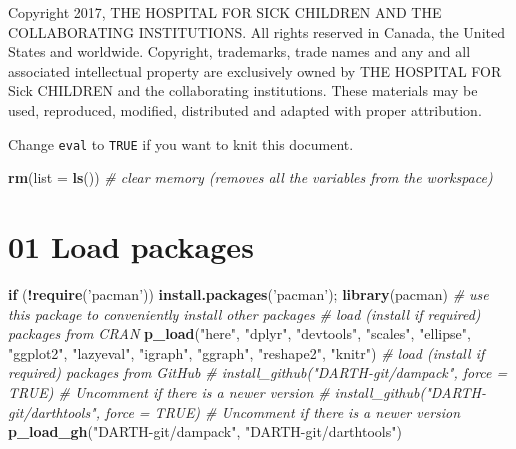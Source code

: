 \documentclass[
]{article}
\newenvironment{Shaded}{\begin{snugshade}}{\end{snugshade}}
\newcommand{\CommentTok}[1]{\textcolor[rgb]{0.56,0.35,0.01}{\textit{#1}}}
\newcommand{\ControlFlowTok}[1]{\textcolor[rgb]{0.13,0.29,0.53}{\textbf{#1}}}
\newcommand{\DataTypeTok}[1]{\textcolor[rgb]{0.13,0.29,0.53}{#1}}
\newcommand{\KeywordTok}[1]{\textcolor[rgb]{0.13,0.29,0.53}{\textbf{#1}}}
\newcommand{\NormalTok}[1]{#1}
\newcommand{\OperatorTok}[1]{\textcolor[rgb]{0.81,0.36,0.00}{\textbf{#1}}}
\newcommand{\StringTok}[1]{\textcolor[rgb]{0.31,0.60,0.02}{#1}}
\begin{document}
Copyright 2017, THE HOSPITAL FOR SICK CHILDREN AND THE COLLABORATING
INSTITUTIONS. All rights reserved in Canada, the United States and
worldwide. Copyright, trademarks, trade names and any and all associated
intellectual property are exclusively owned by THE HOSPITAL FOR Sick
CHILDREN and the collaborating institutions. These materials may be
used, reproduced, modified, distributed and adapted with proper
attribution.

\newpage

Change \texttt{eval} to \texttt{TRUE} if you want to knit this document.

\begin{Shaded}
\begin{Highlighting}[]
\KeywordTok{rm}\NormalTok{(}\DataTypeTok{list =} \KeywordTok{ls}\NormalTok{())      }\CommentTok{# clear memory (removes all the variables from the workspace)}
\end{Highlighting}
\end{Shaded}

\hypertarget{load-packages}{%
\section{01 Load packages}\label{load-packages}}

\begin{Shaded}
\begin{Highlighting}[]
\ControlFlowTok{if}\NormalTok{ (}\OperatorTok{!}\KeywordTok{require}\NormalTok{(}\StringTok{'pacman'}\NormalTok{)) }\KeywordTok{install.packages}\NormalTok{(}\StringTok{'pacman'}\NormalTok{); }\KeywordTok{library}\NormalTok{(pacman) }\CommentTok{# use this package to conveniently install other packages}
\CommentTok{# load (install if required) packages from CRAN}
\KeywordTok{p_load}\NormalTok{(}\StringTok{"here"}\NormalTok{, }\StringTok{"dplyr"}\NormalTok{, }\StringTok{"devtools"}\NormalTok{, }\StringTok{"scales"}\NormalTok{, }\StringTok{"ellipse"}\NormalTok{, }\StringTok{"ggplot2"}\NormalTok{, }\StringTok{"lazyeval"}\NormalTok{, }\StringTok{"igraph"}\NormalTok{, }\StringTok{"ggraph"}\NormalTok{, }\StringTok{"reshape2"}\NormalTok{, }\StringTok{"knitr"}\NormalTok{)                                               }
\CommentTok{# load (install if required) packages from GitHub}
\CommentTok{# install_github("DARTH-git/dampack", force = TRUE) # Uncomment if there is a newer version}
\CommentTok{# install_github("DARTH-git/darthtools", force = TRUE) # Uncomment if there is a newer version}
\KeywordTok{p_load_gh}\NormalTok{(}\StringTok{"DARTH-git/dampack"}\NormalTok{, }\StringTok{"DARTH-git/darthtools"}\NormalTok{)}
\end{Highlighting}
\end{Shaded}
\end{document}
